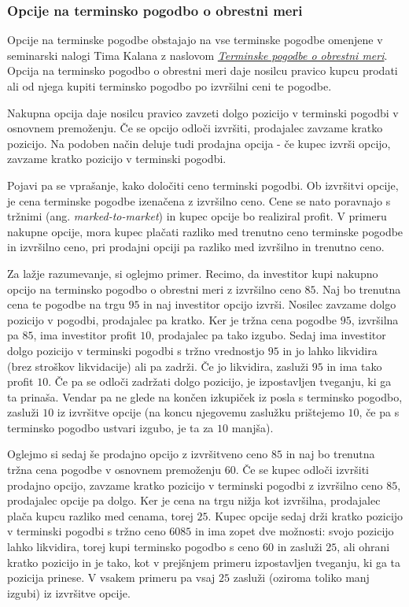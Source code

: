 \documentclass[a4paper]{article}
\begin{document}
\subsubsection{Opcije na terminsko pogodbo o obrestni meri}
Opcije na terminske pogodbe obstajajo na vse terminske pogodbe omenjene v seminarski nalogi Tima Kalana z naslovom 
\href{https://github.com/timkalan/seminar2020}{\textit{Terminske pogodbe o obrestni meri}}. Opcija na terminsko pogodbo o obrestni meri  daje nosilcu pravico
kupcu prodati ali od njega kupiti terminsko pogodbo po izvršilni ceni te pogodbe.

Nakupna opcija daje nosilcu pravico zavzeti dolgo pozicijo v terminski pogodbi v osnovnem premoženju. Če se opcijo odloči izvršiti,
prodajalec zavzame kratko pozicijo. Na podoben način deluje tudi prodajna opcija - če kupec izvrši opcijo, zavzame kratko pozicijo v terminski
pogodbi. 

Pojavi pa se vprašanje, kako določiti ceno terminski pogodbi. Ob izvršitvi opcije, je cena terminske pogodbe izenačena z izvršilno ceno.
Cene se nato poravnajo s tržnimi (ang. \textit{marked-to-market}) in kupec opcije bo realiziral profit. V primeru nakupne opcije, mora kupec plačati razliko med trenutno
ceno terminske pogodbe in izvršilno ceno, pri prodajni opciji pa razliko med izvršilno in trenutno ceno.

Za lažje razumevanje, si oglejmo primer. Recimo, da investitor kupi nakupno opcijo na terminsko pogodbo o obrestni meri z izvršilno ceno
\textdollar$85$. Naj bo trenutna cena te pogodbe na trgu \textdollar$95$  in naj investitor opcijo izvrši. Nosilec zavzame dolgo pozicijo v pogodbi, prodajalec
pa kratko. Ker je tržna cena pogodbe \textdollar$95$, izvršilna pa \textdollar$85$, ima investitor profit \textdollar$10$, prodajalec pa tako izgubo. Sedaj ima
investitor dolgo pozicijo v terminski pogodbi s tržno vrednostjo \textdollar$95$ in jo lahko likvidira (brez stroškov likvidacije) ali pa zadrži. 
Če jo likvidira, zasluži \textdollar$95$ in ima tako profit \textdollar$10$. Če pa se odloči zadržati dolgo pozicijo, je izpostavljen
tveganju, ki ga ta prinaša. Vendar pa ne glede na končen izkupiček iz posla s terminsko pogodbo, zasluži \textdollar$10$ iz izvršitve opcije
(na koncu njegovemu zaslužku prištejemo \textdollar$10$, če pa s terminsko pogodbo ustvari izgubo, je ta za \textdollar$10$ manjša).

Oglejmo si sedaj še prodajno opcijo z izvršitveno ceno \textdollar$85$ in naj bo trenutna tržna cena pogodbe v osnovnem premoženju \textdollar$60$. Če se kupec odloči
izvršiti prodajno opcijo, zavzame kratko pozicijo v terminski pogodbi z izvršilno ceno \textdollar$85$, prodajalec opcije pa dolgo. Ker je cena
na trgu nižja kot izvršilna, prodajalec plača kupcu razliko med cenama, torej \textdollar$25$. Kupec opcije sedaj drži kratko pozicijo
v terminski pogodbi s tržno ceno 60\textdollar$85$ in ima zopet dve možnosti: svojo pozicijo lahko likvidira, torej kupi terminsko pogodbo s ceno \textdollar$60$ in zasluži \textdollar$25$, 
ali ohrani kratko pozicijo in je tako, kot v prejšnjem primeru izpostavljen tveganju, ki ga ta pozicija prinese. V vsakem primeru pa vsaj \textdollar$25$ zasluži
(oziroma toliko manj izgubi) iz izvršitve opcije.
\end{document}
